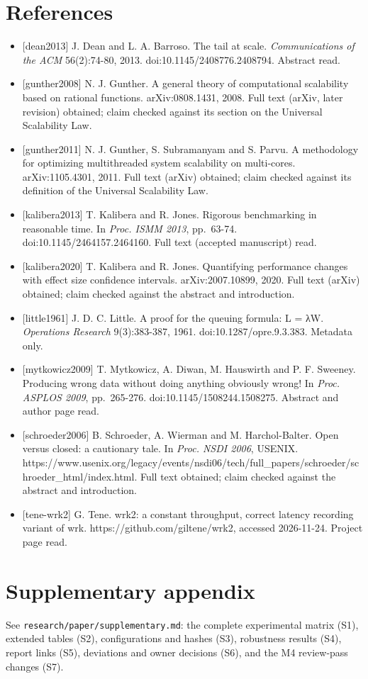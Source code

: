 \documentclass[
]{article}
\providecommand{\tightlist}{%
  \setlength{\itemsep}{0pt}\setlength{\parskip}{0pt}}
\begin{document}
\section{References}\label{references}

\begin{itemize}
\tightlist
\item
  {[}dean2013{]} J. Dean and L. A. Barroso. The tail at scale.
  \emph{Communications of the ACM} 56(2):74-80, 2013.
  doi:10.1145/2408776.2408794. Abstract read.
\item
  {[}gunther2008{]} N. J. Gunther. A general theory of computational
  scalability based on rational functions. arXiv:0808.1431, 2008. Full
  text (arXiv, later revision) obtained; claim checked against its
  section on the Universal Scalability Law.
\item
  {[}gunther2011{]} N. J. Gunther, S. Subramanyam and S. Parvu. A
  methodology for optimizing multithreaded system scalability on
  multi-cores. arXiv:1105.4301, 2011. Full text (arXiv) obtained; claim
  checked against its definition of the Universal Scalability Law.
\item
  {[}kalibera2013{]} T. Kalibera and R. Jones. Rigorous benchmarking in
  reasonable time. In \emph{Proc. ISMM 2013}, pp.~63-74.
  doi:10.1145/2464157.2464160. Full text (accepted manuscript) read.
\item
  {[}kalibera2020{]} T. Kalibera and R. Jones. Quantifying performance
  changes with effect size confidence intervals. arXiv:2007.10899, 2020.
  Full text (arXiv) obtained; claim checked against the abstract and
  introduction.
\item
  {[}little1961{]} J. D. C. Little. A proof for the queuing formula: L =
  λW. \emph{Operations Research} 9(3):383-387, 1961.
  doi:10.1287/opre.9.3.383. Metadata only.
\item
  {[}mytkowicz2009{]} T. Mytkowicz, A. Diwan, M. Hauswirth and P. F.
  Sweeney. Producing wrong data without doing anything obviously wrong!
  In \emph{Proc. ASPLOS 2009}, pp.~265-276. doi:10.1145/1508244.1508275.
  Abstract and author page read.
\item
  {[}schroeder2006{]} B. Schroeder, A. Wierman and M. Harchol-Balter.
  Open versus closed: a cautionary tale. In \emph{Proc. NSDI 2006},
  USENIX.
  https://www.usenix.org/legacy/events/nsdi06/tech/full\_papers/schroeder/schroeder\_html/index.html.
  Full text obtained; claim checked against the abstract and
  introduction.
\item
  {[}tene-wrk2{]} G. Tene. wrk2: a constant throughput, correct latency
  recording variant of wrk. https://github.com/giltene/wrk2, accessed
  2026-11-24. Project page read.
\end{itemize}

\section{Supplementary appendix}\label{supplementary-appendix}

See \texttt{research/paper/supplementary.md}: the complete experimental
matrix (S1), extended tables (S2), configurations and hashes (S3),
robustness results (S4), report links (S5), deviations and owner
decisions (S6), and the M4 review-pass changes (S7).
\end{document}
